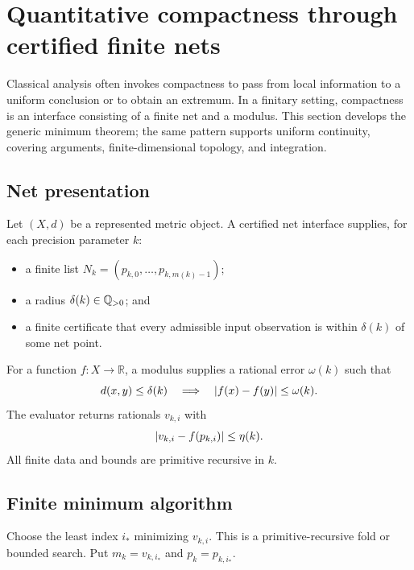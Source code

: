 \section{Quantitative compactness through certified finite nets}
\label{sec:finite-nets}

Classical analysis often invokes compactness to pass from local information to a
uniform conclusion or to obtain an extremum.  In a finitary setting, compactness is an
interface consisting of a finite net and a modulus.  This section develops the generic
minimum theorem; the same pattern supports uniform continuity, covering arguments,
finite-dimensional topology, and integration.

\subsection{Net presentation}

Let \((X,d)\) be a represented metric object.  A certified net interface supplies, for
each precision parameter \(k\):

\begin{itemize}
\item a finite list \(N_k=(p_{k,0},\ldots,p_{k,m(k)-1})\);
\item a radius \(\delta(k)\in\mathbb Q_{>0}\); and
\item a finite certificate that every admissible input observation is within
\(\delta(k)\) of some net point.
\end{itemize}

For a function \(f:X\to\mathbb R\), a modulus supplies a rational error
\(\omega(k)\) such that
\[
  d(x,y)\le\delta(k)\quad\Longrightarrow\quad
  \lvert f(x)-f(y)\rvert\le\omega(k).
\]
The evaluator returns rationals \(v_{k,i}\) with
\[
  \lvert v_{k,i}-f(p_{k,i})\rvert\le\eta(k).
\]
All finite data and bounds are primitive recursive in \(k\).

\subsection{Finite minimum algorithm}

Choose the least index \(i_*\) minimizing \(v_{k,i}\).  This is a primitive-recursive
fold or bounded search.  Put \(m_k=v_{k,i_*}\) and \(p_k=p_{k,i_*}\).

